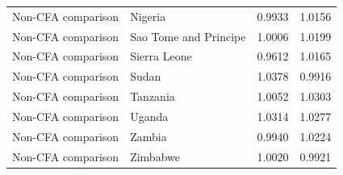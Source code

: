 \begin{table}
\begin{tabular}[t]{llrr}
Non-CFA comparison & Nigeria & 0.9933 & 1.0156\\
Non-CFA comparison & Sao Tome and Principe & 1.0006 & 1.0199\\
Non-CFA comparison & Sierra Leone & 0.9612 & 1.0165\\
\addlinespace
Non-CFA comparison & Sudan & 1.0378 & 0.9916\\
Non-CFA comparison & Tanzania & 1.0052 & 1.0303\\
Non-CFA comparison & Uganda & 1.0314 & 1.0277\\
Non-CFA comparison & Zambia & 0.9940 & 1.0224\\
Non-CFA comparison & Zimbabwe & 1.0020 & 0.9921\\
\bottomrule
\end{tabular}
\end{table}